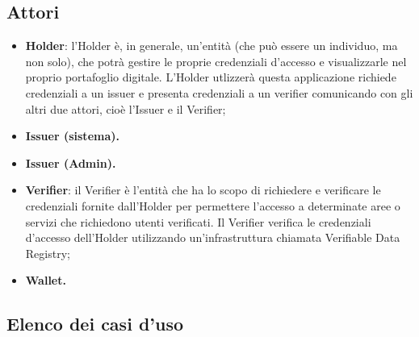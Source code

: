 \subsection{Attori}
\begin{itemize}
    \item\textbf{Holder}: l’Holder è, in generale, un’entità (che può essere un individuo, ma non solo), che potrà gestire le proprie credenziali d’accesso e visualizzarle nel proprio portafoglio digitale. L’Holder utlizzerà questa applicazione richiede credenziali a un issuer e presenta credenziali a un verifier comunicando con gli altri due attori, cioè l’Issuer e il Verifier;
    \item\textbf{Issuer (sistema).}
    \item\textbf{Issuer (Admin).}
    \item\textbf{Verifier}: il Verifier è l’entità che ha lo scopo di richiedere e verificare le credenziali fornite dall’Holder per permettere l’accesso a determinate aree o servizi che richiedono utenti verificati. Il Verifier verifica le credenziali d’accesso dell’Holder utilizzando un’infrastruttura chiamata Verifiable Data Registry;
    \item\textbf{Wallet.}
\end{itemize}

\subsection{Elenco dei casi d'uso}
